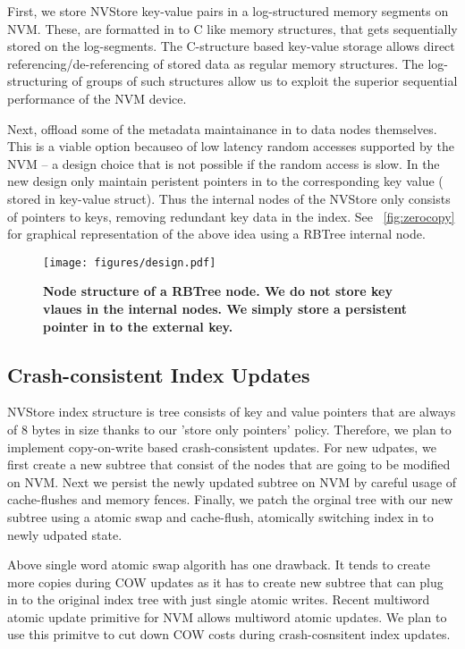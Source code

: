 First, we store NVStore key-value pairs in a log-structured memory segments on NVM. These, are 
formatted in to C like memory structures, that gets sequentially stored on the log-segments. The
C-structure based key-value storage allows direct referencing/de-referencing of stored data 
as regular memory structures. The log-structuring of groups of such structures allow us to 
exploit the superior sequential performance of the NVM device.

Next, offload some of the metadata maintainance in to data nodes themselves. This is a viable
option becauseo of low latency random accesses supported by the NVM -- a design choice that
is not possible if the random access is slow. In the new design only maintain peristent pointers
in to the corresponding key value ( stored in key-value struct). Thus the internal nodes of the 
NVStore only consists of pointers to keys, removing redundant key data in the index. 
See ~\autoref{fig:zerocopy} for graphical representation of the above idea using a RBTree internal
node.

\begin{figure}[]   
	\centering
	\texttt{[image: figures/design.pdf]} 
	\caption{\bf Node structure of a RBTree node. We do not store key vlaues in the internal nodes. We simply
	store a persistent pointer in to the external key.} 
	\label{fig:zerocopy} 
\end{figure}

\subsection{Crash-consistent Index Updates}
NVStore index structure is tree consists of key and value pointers that are always of 8 bytes in size
thanks to our 'store only pointers' policy. Therefore, we plan to implement copy-on-write based 
crash-consistent updates. For new udpates, we first create a new subtree that consist of the nodes
that are going to be modified on NVM. Next we persist the newly updated subtree on NVM by careful
usage of cache-flushes and memory fences. Finally, we patch the orginal tree with our new subtree
using a atomic swap and cache-flush, atomically switching index in to newly udpated state.

Above single word atomic swap algorith has one drawback. It tends to create more copies during
COW updates as it has to create new subtree that can plug in to the original index tree with just 
single atomic writes. Recent multiword atomic update primitive\cite{pmwcas} for NVM allows multiword 
atomic updates. We plan to use this primitve to cut down COW costs during crash-cosnsitent index updates.




